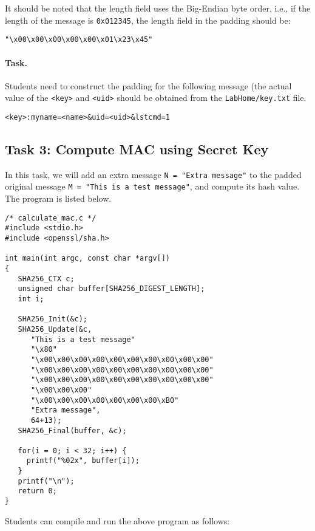 It should be noted that 
the length field uses the Big-Endian byte order, i.e., 
if the length of the message is \texttt{0x012345}, 
the length field in the padding should be:
\begin{lstlisting}
"\x00\x00\x00\x00\x00\x01\x23\x45"
\end{lstlisting}


\paragraph{Task.} Students need to construct the padding for the following
message (the actual value of the \texttt{<key>} and \texttt{<uid>} should
be obtained from the \texttt{LabHome/key.txt} file.  

\begin{lstlisting}
<key>:myname=<name>&uid=<uid>&lstcmd=1
\end{lstlisting}



\subsection{Task 3: Compute MAC using Secret Key}

In this task, we will add an extra message \texttt{N = "Extra message"} 
to the padded original message \texttt{M = "This is a test message"}, 
and compute its hash value. The program is listed below. 

\begin{lstlisting}
/* calculate_mac.c */
#include <stdio.h>
#include <openssl/sha.h>

int main(int argc, const char *argv[])
{
   SHA256_CTX c;
   unsigned char buffer[SHA256_DIGEST_LENGTH];
   int i;

   SHA256_Init(&c);
   SHA256_Update(&c,
      "This is a test message"
      "\x80"
      "\x00\x00\x00\x00\x00\x00\x00\x00\x00\x00"
      "\x00\x00\x00\x00\x00\x00\x00\x00\x00\x00"
      "\x00\x00\x00\x00\x00\x00\x00\x00\x00\x00"
      "\x00\x00\x00"
      "\x00\x00\x00\x00\x00\x00\x00\xB0"
      "Extra message",
      64+13);
   SHA256_Final(buffer, &c);

   for(i = 0; i < 32; i++) {
     printf("%02x", buffer[i]);
   }			
   printf("\n");
   return 0;	 
}
\end{lstlisting}

Students can compile and run the above program as follows:

